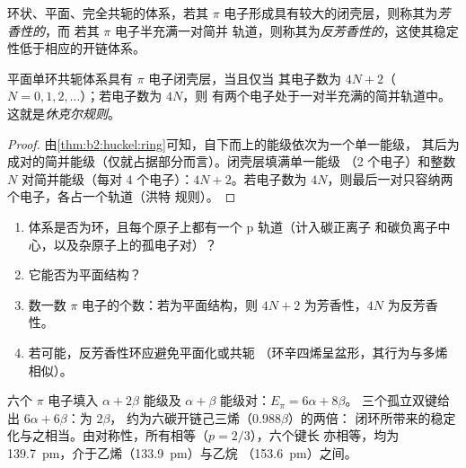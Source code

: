 \begin{definition}[芳香性]\label{def:b2:huckel:aromatic}
环状、平面、完全共轭的体系，若其
$\pi$ 电子形成具有较大的闭壳层，则称其为\emph{芳香性的}，而
若其 $\pi$ 电子半充满一对简并
轨道，则称其为\emph{反芳香性的}，这使其稳定性低于相应的开链体系。
\end{definition}

\begin{theorem}[休克尔规则]\label{thm:b2:huckel:huckel-rule}
平面单环共轭体系具有 $\pi$ 电子闭壳层，当且仅当
其电子数为 $4N + 2$（$N = 0, 1, 2, \dots$）；若电子数为 $4N$，则
有两个电子处于一对半充满的简并轨道中。这就是\emph{休克尔规则}。
\end{theorem}

\begin{proof}
由\cref{thm:b2:huckel:ring}可知，自下而上的能级依次为一个单一能级，
其后为成对的简并能级（仅就占据部分而言）。闭壳层填满单一能级
（2 个电子）和整数 $N$ 对简并能级（每对 4 个电子）：$4N + 2$。若电子数为
$4N$，则最后一对只容纳两个电子，各占一个轨道（洪特
规则）。
\end{proof}

\begin{method}[是否芳香？]\label{met:b2:huckel:aromaticity}
\begin{enumerate}
  \item 体系是否为环，且每个原子上都有一个 p 轨道（计入碳正离子
        和碳负离子中心，以及杂原子上的孤电子对）？
  \item 它能否为平面结构？
  \item 数一数 $\pi$ 电子的个数：若为平面结构，则 $4N + 2$ 为芳香性，$4N$ 为反芳香性。
  \item 若可能，反芳香性环应避免平面化或共轭
        （环辛四烯呈盆形，其行为与多烯相似）。
\end{enumerate}
\end{method}

\begin{example}[苯]\label{ex:b2:huckel:benzene}
六个 $\pi$ 电子填入 $\alpha + 2\beta$ 能级及 $\alpha + \beta$ 能级对：$E_\pi = 6\alpha + 8\beta$。
三个孤立双键给出 $6\alpha + 6\beta$：为 $2\beta$，
约为六碳开链己三烯（$0.988\beta$）的两倍：
闭环所带来的稳定化与之相当。由对称性，所有相等（$p = 2/3$），六个键长
亦相等，均为 \qty{139.7}{pm}，介于乙烯（\qty{133.9}{pm}）与乙烷
（\qty{153.6}{pm}）之间。
\end{example}

